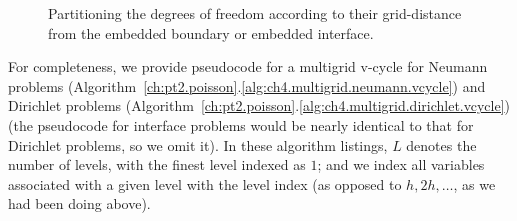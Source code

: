 \setlength{\figureheight}{0.40\columnwidth}
\begin{figure}[htbp]
\begin{center}
\caption{Partitioning the degrees of freedom according to their grid-distance from the embedded boundary or embedded interface.}
\label{fig:ch4.multigrid.boundaryinterfacedistance}
\end{center}
\end{figure}

For completeness, we provide pseudocode for a multigrid v-cycle for Neumann problems (Algorithm~\ref{ch:pt2.poisson}.\ref{alg:ch4.multigrid.neumann.vcycle}) and Dirichlet problems (Algorithm~\ref{ch:pt2.poisson}.\ref{alg:ch4.multigrid.dirichlet.vcycle}) (the pseudocode for interface problems would be nearly identical to that for Dirichlet problems, so we omit it). In these algorithm listings, $L$ denotes the number of levels, with the finest level indexed as $1$; and we index all variables associated with a given level with the level index (as opposed to $h, 2h, \dotsc$, as we had been doing above).

